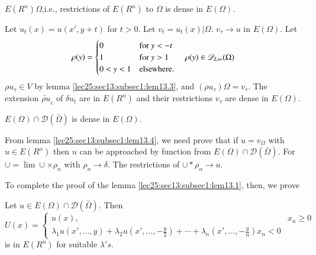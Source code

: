 \begin{lemma}\label{lec25:sec13:subsec1:lem13.4}%
  $E(R^n) \Omega$,\pageoriginale i.e., restrictions of $E(R^n)$ to $\Omega$ is dense
  in $E(\Omega)$. 
  
  Let $u_t (x) = u (x', y + t)$ for $t > 0$. Let $v_t = u_t (x) |
  \Omega$. $v_\tau \to u$ in $E(\Omega)$. Let 
  \begin{equation*}
    \rho (y) = 
    \begin{cases}
      0 & {\rm for }~ y < -t\\
      1 & {\rm for }~ y > 1 \qquad \rho(y) \in \mathscr{D}_{L
        \infty} (\Omega) \\ 
      0 < y < 1 & {\rm elsewhere. }
    \end{cases}
  \end{equation*}
  $\rho u_\tau \in V$ by lemma \ref{lec25:sec13:subsec1:lem13.3}, and $(\rho u_\tau) \Omega =
  v_\tau$. The extension $\widetilde{\rho u}_c$ of $\delta u_t$ are in
  $E(R^n)$ and their restrictions $v_\tau$ are dense in $E(\Omega)$. 
\end{lemma}

\begin{lemma}\label{lec25:sec13:subsec1:lem13.5}%
  $E(\Omega) \cap \mathscr{D} (\bar{\Omega})$ is dense in $E(\Omega)$.
\end{lemma}

From lemma \ref{lec25:sec13:subsec1:lem13.4}, we need prove that if $u = v_{\Omega}$ with $u
\in E(R^n)$ then $u$ can be approached by function from
$E(\Omega) \cap \mathscr{D} (\bar{\Omega})$. For $\cup= \lim \cup
\times \rho_n$ with $\rho_n \to \delta$. The restrictions of $\cup *
\rho_n \to u$.  

To complete the proof of the lemma \ref{lec25:sec13:subsec1:lem13.1}, then, we prove
\begin{lemma}\label{lec25:sec13:subsec1:lem13.6}%
  Let $u \in E (\Omega) \cap \mathscr{D} (\bar{\Omega})$. Then
{\fontsize{9}{11}\selectfont
  \begin{equation*}
    U(x) =
    \begin{cases}
      u(x), & x_n \geq 0\\
      \lambda_1 u(x',\ldots,y) + \lambda_2 u(x',\ldots, -\frac{y}{2}) + \cdots   +  \lambda_n (x', \ldots, -\frac{y}{n}) x_n< 0 
    \end{cases}
  \end{equation*}}\relax
  is in $E(R^n)$ for suitable $\lambda's$.
\end{lemma}

